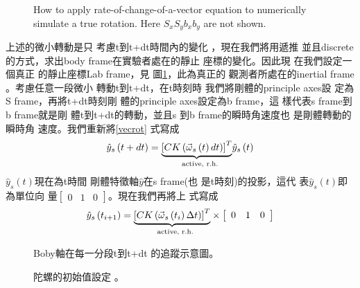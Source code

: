 \documentclass[12pt,twoside]{article}
\begin{document}
\begin{figure}[th]
\caption{How to apply rate-of-change-of-a-vector equation to numerically
simulate a true rotation. Here $S_{x}S_{y}b_{x}b_{y}$ are not shown.}
\label{szsbtdtfig}
\begin{center}
\fbox{}
\end{center}
\end{figure}

上述的微小轉動是只%
考慮t到t+dt時間內的變化%
，現在我們將用遞推%
並且discrete的方式，求出body
frame在實驗者處在的靜止%
座標的變化。因此現%
在我們設定一個真正%
的靜止座標Lab frame\thinspace ，見%
圖\ref{szsbtdtfig}，此為真正的%
觀測者所處在的inertial frame%
。考慮任意一段微小%
轉動t到t+dt，在t時刻時%
我們將剛體的principle axes設%
定為S frame，再將t+dt時刻剛%
體的principle axes設定為b frame，這%
樣代表s frame到b frame就是剛%
體t到t+dt的轉動，並且s%
到b frame的瞬時角速度也%
是剛體轉動的瞬時角%
速度。我們重新將\ref{vecrot}%
式寫成%
\begin{equation}
\hat{y}_{s}\left( t+dt\right) =\underset{\text{active, r.h.}}{\underbrace{%
\left[ CK\left( \vec{\omega}_{s}\left( t\right) dt\right) \right] ^{T}}}\hat{%
y}_{s}\left( t\right)  \label{vecrot05}
\end{equation}%
$\hat{y}_{s}\left( t\right) $現在為t時間%
剛體特徵軸$\hat{y}$在s frame(也%
是t時刻)的投影，這代%
表$\hat{y}_{s}\left( t\right) $即為單位向%
量$\left[ 
\begin{array}{ccc}
0 & 1 & 0%
\end{array}%
\right] $。現在我們再將上%
式寫成%
\begin{equation}
\hat{y}_{s}\left( t_{i+1}\right) =\underset{\text{active, r.h.}}{\underbrace{%
\left[ CK\left( \vec{\omega}_{s}\left( t_{i}\right) \Delta t\right) \right]
^{T}}}\times \left[ 
\begin{array}{ccc}
0 & 1 & 0%
\end{array}%
\right]  \label{vecrot1}
\end{equation}

\begin{figure}[th]
\caption{Boby軸在每一分段t到t+dt%
的追蹤示意圖。}
\begin{center}
\fbox{}
\end{center}
\end{figure}

\begin{figure}[th]
\caption{陀螺的初始值設定%
。}
\begin{center}
\fbox{}
\end{center}
\end{figure}
\end{document}

